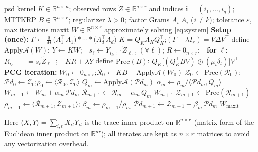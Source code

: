 \documentclass[12pt]{article}
\newcommand{\bR}{\mathbb{R}}
\begin{document}
\begin{algorithm}[h]
\caption{Matrix-free Preconditioned CG (PCG) for the mode-$k$ RKHS subproblem}
\label{alg:pcg}
\begin{algorithmic}[1]
  \Require psd kernel $K\in\bR^{n\times n}$; observed rows $\widetilde Z\in\bR^{q\times r}$
    and indices $\mathbf i=(i_1,\dots,i_q)$; MTTKRP $B\in\bR^{n\times r}$;
    regularizer $\lambda>0$; factor Grams $A_i^{\!\top}A_i$ ($i\ne k$); tolerance
    $\varepsilon$, max iterations $\mathrm{maxit}$
  \Ensure $W\in\bR^{n\times r}$ approximately solving \eqref{eq:system}
  \Statex \textbf{Setup (once):}
  \State $\Gamma\gets \frac{q}{M}\,\big(A_1^{\!\top}A_1\big)\ast\cdots\ast\big(A_d^{\!\top}A_d\big)$ 
  \State $K=Q_K\Lambda_K Q_K^{\!\top}$;\quad $(\Gamma+\lambda I_r)=V\Delta V^{\!\top}$ 
  \State define $\mathrm{Apply}\mathcal A(W)$: \quad $Y\gets KW$;\ \ $s_\ell\gets Y_{i_\ell,:}\cdot\widetilde Z_{\ell,:}\ (\forall\ell)$;
  \Statex {}$R\gets 0_{n\times r}$;\ \ \textbf{for} $\ell$: $R_{i_\ell,:}\!\mathrel{+}=\! s_\ell\widetilde Z_{\ell,:}$;\ \ \Return $KR+\lambda Y$ 
  \State define $\mathrm{Prec}(B)$: \Return $Q_K\big[(Q_K^{\!\top}BV)\oslash(\mu_i\delta_t)\big]V^{\!\top}$ 
  \Statex \textbf{PCG iteration:}
  \State $W_0\gets 0_{n\times r}$;\quad $\mathcal R_0\gets KB-\mathrm{Apply}\mathcal A(W_0)$ 
  \State $\mathcal Z_0\gets \mathrm{Prec}(\mathcal R_0)$;\quad $\mathcal Pd_0\gets \mathcal Z_0$;\quad $\rho_0\gets\langle\mathcal R_0,\mathcal Z_0\rangle$
     \State $Q_m\gets \mathrm{Apply}\mathcal A(\mathcal Pd_m)$
     \State $\alpha_m\gets \rho_m/\langle \mathcal Pd_m,Q_m\rangle$
     \State $W_{m+1}\gets W_m+\alpha_m\,\mathcal Pd_m$
     \State $\mathcal R_{m+1}\gets \mathcal R_m-\alpha_m\,Q_m$
      \Return $W_{m+1}$ \EndIf
     \State $\mathcal Z_{m+1}\gets \mathrm{Prec}(\mathcal R_{m+1})$
     \State $\rho_{m+1}\gets \langle \mathcal R_{m+1},\mathcal Z_{m+1}\rangle$;\quad
            $\beta_m\gets \rho_{m+1}/\rho_m$
     \State $\mathcal Pd_{m+1}\gets \mathcal Z_{m+1}+\beta_m\,\mathcal Pd_m$
  \EndFor
  \State \Return $W_{\mathrm{maxit}}$
\end{algorithmic}
\end{algorithm}

Here $\langle X,Y\rangle=\sum_{i,t}X_{it}Y_{it}$ is the trace inner product on
$\bR^{n\times r}$ (matrix form of the Euclidean inner product on $\bR^{nr}$); all
iterates are kept as $n\times r$ matrices to avoid any vectorization overhead.
\end{document}
